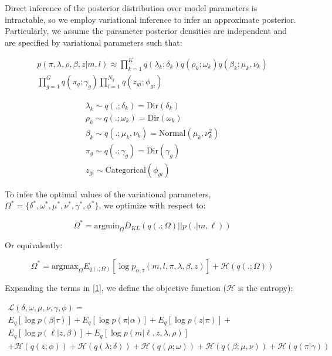 \documentclass{article}
\newcommand{\Lagr}{\mathcal{L}}
\begin{document}
Direct inference of the posterior distribution over model parameters is intractable, so we employ variational inference to infer an approximate posterior. Particularly,
we assume the parameter posterior densities are independent and are specified by variational parameters such that:

\begin{equation}
\begin{split}
p(\pi,\lambda,\rho,\beta,z | m, l) \approx \prod_{k=1}^K q(\lambda_k; \delta_k)q(\rho_k; \omega_k)q(\beta_k; \mu_k, \nu_k) \\
	\prod_{g=1}^G q(\pi_g; \gamma_g) \prod_{i=1}^{N_g} q(z_{gi};\phi_{gi})
\end{split}
\end{equation}

\begin{align*}
\lambda_k \sim q(.;\delta_k) = \textrm{Dir}(\delta_k) \\
	\rho_k \sim q(.;\omega_k) = \textrm{Dir}(\omega_k) \\
	\beta_k \sim q(.;\mu_k, \nu_k) = \textrm{Normal}(\mu_k, \nu_k^2) \\
	\pi_g \sim q(.;\gamma_g) = \textrm{Dir}(\gamma_g) \\
	z_{gi} \sim \textrm{Categorical}(\phi_{gi})
\end{align*}

To infer the optimal values of the variational parameters, $\Omega^* = \{\delta^*, \omega^*, \mu^*, \nu^*, \gamma^*, \phi^*\}$, we optimize with respect to:

\begin{equation}
\Omega^* = \mathrm{argmin}_{\Omega} D_{KL}( q(.;\Omega) || p(.| m, \ell) )
\end{equation}

Or equivalently:

\begin{equation} \label{1}
\Omega^* = \mathrm{argmax}_{\Omega} E_{q(.;\Omega)}[\log p_{\alpha,\tau}(m,l, \pi, \lambda, \beta, z)] + \mathcal{H}(q(.;\Omega))
\end{equation}

Expanding the terms in \eqref{1}, we define the objective function ($\mathcal{H}$ is the entropy):

\begin{equation} \label{L}
\begin{split}
\Lagr(\delta, \omega, \mu, \nu, \gamma, \phi) = \\
	E_q [\log p(\beta | \tau)] + E_q [\log{p(\pi | \alpha)}] +  E_q [\log{p(z | \pi )}] + \\
	E_q [\log{p(\ell | z, \beta)}] + E_q [\log{p(m | \ell, z, \lambda, \rho)}] \\
	+ \mathcal{H}(q(z;\phi)) + \mathcal{H}(q(\lambda;\delta)) + \mathcal{H}(q(\rho;\omega)) + \mathcal{H}(q(\beta;\mu, \nu)) + \mathcal{H}(q(\pi|\gamma)) 
\end{split}
\end{equation}
\end{document}
